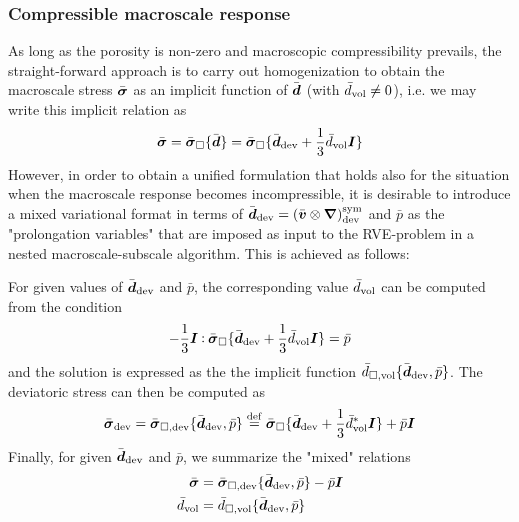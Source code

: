 \documentclass[10pt,a4paper]{article}
\begin{document}
\subsubsection{Compressible macroscale response}

As long as the porosity is non-zero and macroscopic compressibility prevails, the straight-forward approach is to carry out homogenization to obtain the macroscale stress $\bar{\boldsymbol{\sigma}}$ as an implicit function of $\bar{\boldsymbol{d}}$ (with $\bar{d}_{\mathrm{vol}}\neq 0$), i.e. we may write this implicit relation as
\begin{equation}
   \bar{\boldsymbol{\sigma}} = \bar{\boldsymbol{\sigma}}_\Box\{\bar{\boldsymbol{d}}\} = \bar{\boldsymbol{\sigma}}_\Box\{\bar{\boldsymbol{d}}_{\mathrm{dev}} +\frac13\bar{d}_{\mathrm{vol}}\boldsymbol{I}\}
\label{eq416a}
\end{equation}
However, in order to obtain a unified formulation that holds also for the situation when the macroscale response becomes incompressible, it is desirable to introduce a mixed variational format in terms of $\bar{\boldsymbol{d}}_{\mathrm{dev}}=\left(\bar{\boldsymbol{v}}\mathbin{\otimes}\boldsymbol{\nabla}\right)^{\mathrm{sym}}_{\mathrm{dev}}$ and $\bar{p}$ as the "prolongation variables" that are imposed as input to the RVE-problem in a nested macroscale-subscale algorithm. This is achieved as follows:

For given values of $\bar{\boldsymbol{d}}_{\mathrm{dev}}$ and $\bar{p}$, the corresponding value $\bar{d}_{\mathrm{vol}}$ can be computed from the condition
\begin{equation}
    -\frac13 \boldsymbol{I}\mathbin{\vcentcolon} \bar{\boldsymbol{\sigma}}_\Box\{\bar{\boldsymbol{d}}_{\mathrm{dev}} +\frac13\bar{d}_{\mathrm{vol}}\boldsymbol{I}\} = \bar p
\label{eq416}
\end{equation}
and the solution is expressed as the the implicit function $\bar{d}_{\Box,\mathrm{vol}}\{\bar{\boldsymbol{d}}_{\mathrm{dev}},\bar{p}\}$. The deviatoric stress can then be computed as
\begin{equation}
    \bar{\boldsymbol{\sigma}}_{\mathrm{dev}} = \bar{\boldsymbol{\sigma}}_{\Box,\mathrm{dev}}\{\bar{\boldsymbol{d}}_{\mathrm{dev}},\bar p\} \overset{\mathrm{def}}{=} \bar{\boldsymbol{\sigma}}_\Box\{\bar{\boldsymbol{d}}_{\mathrm{dev}} + \frac13 \bar{d}_{\mathrm{vol}}^*\boldsymbol{I}\} + \bar{p}\boldsymbol{I}
\label{eq418}
\end{equation}
Finally, for given $\bar{\boldsymbol{d}}_{\mathrm{dev}}$ and $\bar{p}$, we summarize the "mixed" relations
\begin{align}
 \bar{\boldsymbol{\sigma}} & =  \bar{\boldsymbol{\sigma}}_{\Box,\mathrm{dev}}\{\bar{\boldsymbol{d}}_{\mathrm{dev}},\bar p\} - \bar p\boldsymbol{I}
\label{eq418a}\\
 \bar{d}_{\mathrm{vol}} & =  \bar{d}_{\Box,\mathrm{vol}}\{\bar{\boldsymbol{d}}_{\mathrm{dev}}, \bar p\}
\label{eq418b}
\end{align}
\end{document}
